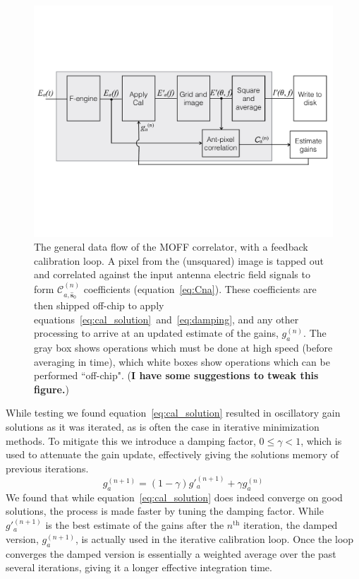 \documentclass[a4paper,fleqn,usenatbib]{../mnras}
\newcommand{\spix}{\ensuremath{\hat{\mathbf{s}}_{0}}}
\newcommand{\Cna}[1][n]{\ensuremath{\mathcal{C}^{(#1)}_{a,\spix}}}
\newcommand{\damp}{\ensuremath{\gamma}}
\begin{document}
\begin{figure}
\begin{center}
\includegraphics[width=\columnwidth]{figures/schematic.pdf}
\caption{The general data flow of the MOFF correlator, with a feedback calibration loop. A pixel from the (unsquared) image is tapped out and correlated against the input antenna electric field signals to form $\Cna$ coefficients (equation~\ref{eq:Cna}). These coefficients are then shipped off-chip to apply equations~\ref{eq:cal_solution}~and~\ref{eq:damping}, and any other processing to arrive at an updated estimate of the gains, $g^{(n)}_a$. The gray box shows operations which must be done at high speed (before averaging in time), which white boxes show operations which can be performed ``off-chip". ({\bf I have some suggestions to tweak this figure.})}
\label{fig:schematic}
\end{center}
\end{figure}

While testing we found equation~\ref{eq:cal_solution} resulted in oscillatory gain solutions as it was iterated, as is often the case in iterative minimization methods. To mitigate this we introduce a damping factor, $0 \leq \damp <1$, which is used to attenuate the gain update, effectively giving the solutions memory of previous iterations.
\begin{equation}\label{eq:damping}
g^{(n+1)}_a = (1-\damp) g'^{(n+1)}_a + \damp g^{(n)}_a
\end{equation}
We found that while equation~\ref{eq:cal_solution} does indeed converge on good solutions, the process is made faster by tuning the damping factor. While $g'^{(n+1)}_a$ is the best estimate of the gains after the $n^{\textrm{th}}$ iteration, the damped version, $g^{(n+1)}_a$, is actually used in the iterative calibration loop. Once the loop converges the damped version is essentially a weighted average over the past several iterations, giving it a longer effective integration time. 
\end{document}
